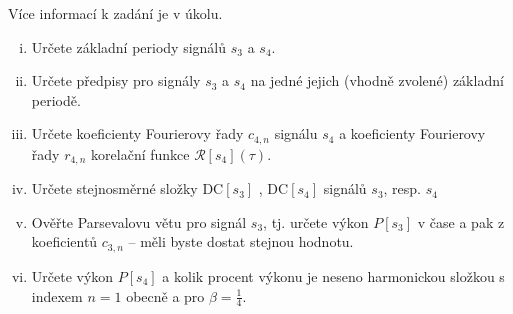 \documentclass{article}
\begin{document}
\vspace{0.5em}
\noindent {} Více informací k zadání je v úkolu.
\begin{enumerate}[(i)]
    \item Určete základní periody signálů $s_3$ a $s_4$.
    \item Určete předpisy pro signály $s_3$ a $s_4$ na jedné jejich (vhodně zvolené) základní periodě.
    \item Určete koeficienty Fourierovy řady $c_{4,n}$ signálu $s_4$ a koeficienty Fourierovy řady $r_{4,n}$ korelační funkce $\mathcal{R}[s_4](\tau)$.
    \item Určete stejnosměrné složky $\text{DC}\left[s_3\right]$ , $\text{DC}\left[s_4\right]$ signálů $s_3$, resp. $s_4$
    \item Ověřte Parsevalovu větu pro signál $s_3$, tj. určete výkon $P[s_3]$ v čase a pak z koeficientů $c_{3,n}$ – měli byste dostat stejnou hodnotu.
    \item Určete výkon $P[s_4]$ a kolik procent výkonu je neseno harmonickou složkou s indexem $n = 1$ obecně a pro $\beta = \frac{1}{4}$.
\end{enumerate}

\newpage
\end{document}
